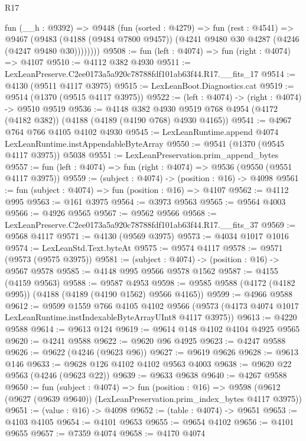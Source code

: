\begin{lexlean}{R17}
\begin{coremodule}
        fun (__h : @9392) =>
        @9448
          (fun (sorted : @4279) =>
          fun (rest : @4541) =>
          @9467
            (@9483
              (@4188 (@9484 @7800 @9457))
              (@4241 @9480 @30 @4287 (@4246 (@4247 @9480 @30))))))))
@9508 := fun (left : @4074) => fun (right : @4074) => @4107
@9510 := @4112 @382 @4930
@9511 := LexLeanPreserve.C2ee0173a5a920c78788fdf101ab63f44.R17.__fits_17
@9514 := @4130 (@9511 @4117 @3975)
@9515 := LexLeanBoot.Diagnostics.cat
@9519 := @9514 (@1370 (@9515 @4117 @3975))
@9522 := (left : @4074) -> (right : @4074) -> @9510 @9519
@9536 := @4148
    @382
    @4930
    @9519
    @768
    @4954
    (@4172 (@4182 @382))
    (@4188 (@4189 (@4190 @768) @4930 @4165))
@9541 := @4967 @764 @766 @4105 @4102 @4930
@9545 := LexLeanRuntime.append @4074 LexLeanRuntime.instAppendableByteArray
@9550 := @9541 (@1370 (@9545 @4117 @3975)) @5038
@9551 := LexLeanPreservation.prim_append_bytes
@9557 := fun (left : @4074) => fun (right : @4074) => @9536 (@9550 (@9551 @4117 @3975))
@9559 := (subject : @4074) -> (position : @16) -> @4098
@9561 := fun (subject : @4074) => fun (position : @16) => @4107
@9562 := @4112 @995
@9563 := @161 @3975
@9564 := @3973 @9563
@9565 := @9564 @4003
@9566 := @4926 @9565
@9567 := @9562 @9566
@9568 := LexLeanPreserve.C2ee0173a5a920c78788fdf101ab63f44.R17.__fits_37
@9569 := @9568 @4117
@9571 := @4130 (@9569 @3975)
@9573 := @4034 @1017 @1016
@9574 := LexLeanStd.Text.byteAt
@9575 := @9574 @4117
@9578 := @9571 (@9573 (@9575 @3975))
@9581 := (subject : @4074) -> (position : @16) -> @9567 @9578
@9585 := @4148 @995 @9566 @9578 @1562
@9587 := @4155 (@4159 @9563)
@9588 := @9587 @4953
@9598 := @9585 @9588 (@4172 (@4182 @995)) (@4188 (@4189 (@4190 @1562) @9566 @4165))
@9599 := @4966 @9588
@9612 := @9599
    @1559
    @766
    @4105
    @4102
    @9566
    (@9573 (@4173 @4074 @1017 LexLeanRuntime.instIndexableByteArrayUInt8 @4117 @3975))
@9613 := @4220 @9588
@9614 := @9613 @124
@9619 := @9614 @148 @4102 @4104 @4925 @9565
@9620 := @4241 @9588
@9622 := @9620 @96 @4925
@9623 := @4247 @9588
@9626 := @9622 (@4246 (@9623 @96))
@9627 := @9619 @9626
@9628 := @9613 @146
@9633 := @9628 @126 @4102 @4102 @9563 @4003
@9638 := @9620 @22 @9563 (@4246 (@9623 @22))
@9639 := @9633 @9638
@9640 := @4267 @9588
@9650 := fun (subject : @4074) =>
  fun (position : @16) =>
  @9598 (@9612 (@9627 (@9639 @9640)) (LexLeanPreservation.prim_index_bytes @4117 @3975))
@9651 := (value : @16) -> @4098
@9652 := (table : @4074) -> @9651
@9653 := @4103 @4105
@9654 := @4101 @9653
@9655 := @9654 @4102
@9656 := @4101 @9655
@9657 := @7359 @4074
@9658 := @4170 @4074

\end{coremodule}
\end{lexlean}
